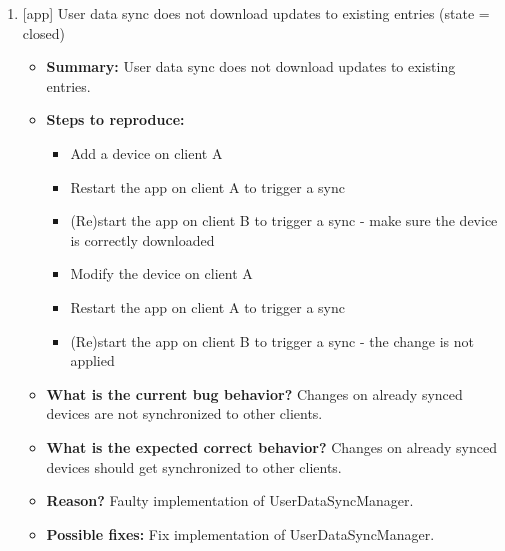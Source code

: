 \begin{enumerate}
\item {[app] User data sync does not download updates to existing entries (state = closed)}
\begin{itemize}	
	\item \textbf{Summary: }User data sync does not download updates to existing entries.\\
	\item \textbf{Steps to reproduce: }
	\begin{itemize}
		\item Add a device on client A\\
		\item 	Restart the app on client A to trigger a sync\\
		\item 	(Re)start the app on client B to trigger a sync - make sure the device is correctly downloaded\\
		\item 	Modify the device on client A\\
		\item 	Restart the app on client A to trigger a sync\\
		\item 	(Re)start the app on client B to trigger a sync - the change is not applied\\
	\end{itemize}
	\item \textbf{What is the current bug behavior? }Changes on already synced devices are not synchronized to other clients.\\
	\item \textbf{What is the expected correct behavior? }Changes on already synced devices should get synchronized to other clients.\\
	\item \textbf{Reason? }Faulty implementation of UserDataSyncManager.\\
	\item \textbf{Possible fixes: }Fix implementation of UserDataSyncManager.\\
\end{itemize}




\end{enumerate}

